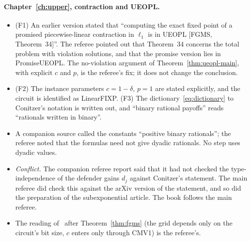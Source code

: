 \paragraph{Chapter~\ref{ch:upper}, contraction and UEOPL.}
\begin{itemize}[nosep]
\item (F1) An earlier version stated that ``computing the exact fixed point of a promised
piecewise-linear contraction in $\ell_1$ is in UEOPL [FGMS, Theorem~34]''. The referee pointed out that
Theorem~34 concerns the total problem with violation solutions, and that the promise version lies in
PromiseUEOPL. The no-violation argument of Theorem~\ref{thm:ueopl-main}, with explicit $c$ and $p$, is the
referee's fix; it does not change the conclusion.
\item (F2) The instance parameters $c=1-\delta$, $p=1$ are stated explicitly, and the circuit is
identified as LinearFIXP. (F3) The dictionary~\eqref{eq:dictionary} to Conitzer's notation is written
out, and ``binary rational payoffs'' reads ``rationals written in binary''.
\item A companion source called the constants ``positive binary rationals''; the referee noted that the
formulas need not give dyadic rationals. No step uses dyadic values.
\item \emph{Conflict.} The companion referee report said that it had not checked the
type-independence of the defender gains $d_j$ against Conitzer's statement. The main referee did check
this against the arXiv version of the statement, and so did the preparation of the subexponential
article. The book follows the main referee.
\item The reading of~\cite{fgms18} after Theorem~\ref{thm:fgms} (the grid depends only on the circuit's
bit size, $c$ enters only through CMV1) is the referee's.
\end{itemize}

